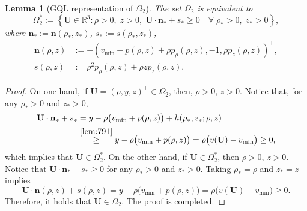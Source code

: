 \documentclass[times,final]{elsarticle}
\newtheorem{lemma}[theorem]{Lemma}
\numberwithin{equation}{section}
\theoremstyle{definition}
\theoremstyle{remark}
\newcommand{\BU}{\mathbf{U}}
\newcommand{\Bn}{\mathbf{n}}
\begin{document}
\begin{lemma}[GQL representation of $\Omega_2$]\label{lem:647}
	The set $\Omega_2$ is equivalent to
	\begin{equation*}\label{eq:559}
		\Omega_2^* := \left\{
		\BU \in \mathbb{R}^3 
		: 
		\rho > 0, \; z > 0, \; \BU \cdot \mathbf{n}_* + s_* \geq 0 \quad \forall \; \rho_* > 0, \; z_* > 0 
		\right\},
	\end{equation*}
	where $\mathbf{n}_* := \mathbf{n}(\rho_*,z_*)$, $s_* := s(\rho_*,z_*)$, 
	\begin{equation*}\label{eq:638}
		\begin{aligned}
			\mathbf{n}(\rho,z) &:= - \left(v_{\min} + p (\rho, z) + \rho p_\rho(\rho, z), -1, \rho p_{z} (\rho, z) \right)^\top,
			\\
			s(\rho,z) &:= \rho^2 p_\rho (\rho, z) + \rho z p_z (\rho, z).
		\end{aligned}
	\end{equation*}
\end{lemma}

\begin{proof}
	On one hand, if $\BU = (\rho,y,z)^\top \in \Omega_2$, then, $\rho > 0$, $z > 0$. Notice that, for any $\rho_* > 0$ and $z_* > 0$, 
	\begin{equation}\label{eq:632}
		\begin{aligned}
			\BU \cdot \Bn_* + s_* 
			&= 
			y - \rho \big( v_{\min} + p(\rho,z)\big) + h(\rho_*,z_*;\rho,z)
			\\
			&\stackrel{\rm \Cref{lem:791}}{\ge}
			y - \rho \big( v_{\min} + p(\rho,z)\big)
			=
			\rho \big( v(\BU) - v_{\min}\big)
			\ge 0
			,
		\end{aligned}
	\end{equation}
	which implies that $\BU \in \Omega_2^*$.
	On the other hand, if $\BU \in \Omega_2^*$, then $\rho > 0$, $z > 0$.
	Notice that $\BU \cdot \Bn_* + s_* \ge 0$ for any $\rho_* > 0$ and $z_* > 0$. Taking $\rho_* = \rho$ and $z_* = z$ implies
	\[
	\BU \cdot \Bn(\rho,z) + s(\rho,z)
	=
	y - \rho \big( v_{\min} + p(\rho,z)\big)
	=
	\rho \big( v(\BU) - v_{\min}\big)
	\ge 0.
	\]
	Therefore, it holds that $\BU \in \Omega_2$. The proof is completed.
\end{proof}
\end{document}
